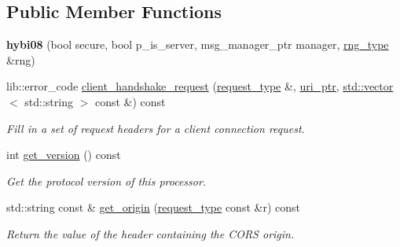 \subsection*{Public Member Functions}
\begin{DoxyCompactItemize}
\item 
\mbox{\label{classwebsocketpp_1_1processor_1_1hybi08_aee51a54933474952a77d7dbe8ce1e06b}} 
{\bfseries hybi08} (bool secure, bool p\+\_\+is\+\_\+server, msg\+\_\+manager\+\_\+ptr manager, \mbox{\hyperlink{classwebsocketpp_1_1random_1_1none_1_1int__generator}{rng\+\_\+type}} \&rng)
\item 
lib\+::error\+\_\+code \mbox{\hyperlink{classwebsocketpp_1_1processor_1_1hybi08_a9509cba08ab3a15ea2ff34276b2582cb}{client\+\_\+handshake\+\_\+request}} (\mbox{\hyperlink{classwebsocketpp_1_1http_1_1parser_1_1request}{request\+\_\+type}} \&, \mbox{\hyperlink{namespacewebsocketpp_aae370ea5ac83a8ece7712cb39fc23f5b}{uri\+\_\+ptr}}, \mbox{\hyperlink{classstd_1_1vector}{std\+::vector}}$<$ std\+::string $>$ const \&) const
\begin{DoxyCompactList}\small\item\em Fill in a set of request headers for a client connection request. \end{DoxyCompactList}\item 
\mbox{\label{classwebsocketpp_1_1processor_1_1hybi08_aec4ce6245dbbd2532513a0f9704e4d7a}} 
int \mbox{\hyperlink{classwebsocketpp_1_1processor_1_1hybi08_aec4ce6245dbbd2532513a0f9704e4d7a}{get\+\_\+version}} () const
\begin{DoxyCompactList}\small\item\em Get the protocol version of this processor. \end{DoxyCompactList}\item 
\mbox{\label{classwebsocketpp_1_1processor_1_1hybi08_a9d1844d9fc422723461c14e3f4d63faa}} 
std\+::string const  \& \mbox{\hyperlink{classwebsocketpp_1_1processor_1_1hybi08_a9d1844d9fc422723461c14e3f4d63faa}{get\+\_\+origin}} (\mbox{\hyperlink{classwebsocketpp_1_1http_1_1parser_1_1request}{request\+\_\+type}} const \&r) const
\begin{DoxyCompactList}\small\item\em Return the value of the header containing the C\+O\+RS origin. \end{DoxyCompactList}\end{DoxyCompactItemize}
